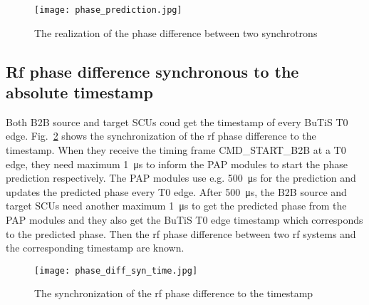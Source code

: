 \begin{figure}[!htb]
   \centering   
   \texttt{[image: phase\_prediction.jpg]}
   \caption{The realization of the phase difference between two synchrotrons}
   \label{phase_prediction}
\end{figure}

\subsection{Rf phase difference synchronous to the absolute timestamp}
Both B2B source and target SCUs coud get the timestamp of every BuTiS T0 edge. Fig.~\ref{phase_diff_syn_time} shows the synchronization of the rf phase difference to the timestamp. When they receive the timing frame CMD\_START\_B2B at a T0 edge, they need maximum \SI{1}{\us} to inform the PAP modules to start the phase prediction respectively. The PAP modules use e.g. \SI{500}{\us} for the prediction and updates the predicted phase every T0 edge. After \SI{500}{\us}, the B2B source and target SCUs need another maximum \SI{1}{\us} to get the predicted phase from the PAP modules and they also get the BuTiS T0 edge timestamp which corresponds to the predicted phase. Then the rf phase difference between two rf systems and the corresponding timestamp are known. 
 \begin{figure}[!htb]
   \centering   
   \texttt{[image: phase\_diff\_syn\_time.jpg]}
   \caption{The synchronization of the rf phase difference to the timestamp}
   \label{phase_diff_syn_time}
\end{figure}
